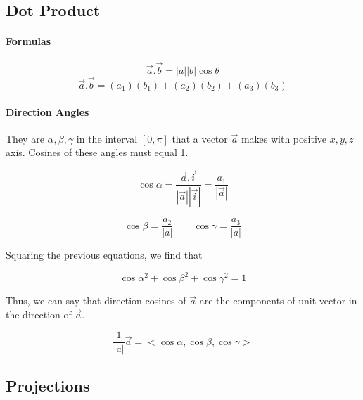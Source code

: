 \documentclass{article}
\begin{document}
	\newpage

	\subsection{Dot Product}

	\paragraph{Formulas}

	\begin{equation}
		\vec{a} . \vec{b} = |a||b| \cos{\theta} 
	\end{equation}
	\begin{equation}
		\vec{a} . \vec{b} = (a_1)(b_1) + (a_2)(b_2) + (a_3)(b_3)
	\end{equation}

	\paragraph{Direction Angles}
	They are $\alpha, \beta, \gamma$ in the interval $[0,\pi]$ that a vector $\vec{a}$ makes with positive $x,y,z$ axis. Cosines of these angles must equal 1.

	\begin{equation}
		\cos{\alpha} = \frac{\vec{a} . \vec{i}}{|\vec{a}| |\vec{i}|} = \frac{a_1}{|\vec{a}|}
	\end{equation}

	\begin{equation*}
		\cos{\beta} = \frac{a_2}{|a|} \qquad \cos{\gamma} = \frac{a_3}{|a|}	
	\end{equation*}

	Squaring the previous equations, we find that

	\begin{equation}
		\cos{\alpha}^2 + \cos{\beta}^2 + \cos{\gamma}^2 = 1
	\end{equation}

	Thus, we can say that direction cosines of $\vec{a}$ are the components of unit vector in the direction of $ \vec{a}$.

	\begin{equation}
		\frac{1}{|a|} \vec{a} = <\cos{\alpha} , \cos{\beta} , \cos{\gamma}>
	\end{equation}

	\noindent\hrulefill 

	\newpage

	\subsection{Projections}
\end{document}
